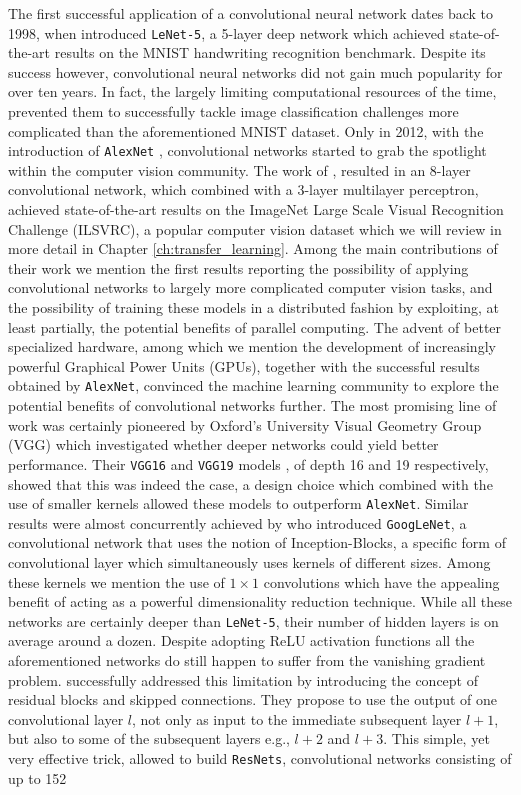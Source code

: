 The first successful application of a convolutional neural network dates back to 1998, when \citet{lecun1998gradient} introduced \texttt{LeNet-5}, a 5-layer deep network which achieved state-of-the-art results on the MNIST handwriting recognition benchmark. Despite its success however, convolutional neural networks did not gain much popularity for over ten years. In fact, the largely limiting computational resources of the time, prevented them to successfully tackle image classification challenges more complicated than the aforementioned MNIST dataset. Only in 2012, with the introduction of \texttt{AlexNet} \cite{krizhevsky2012imagenet}, convolutional networks started to grab the spotlight within the computer vision community.  The work of \citet{krizhevsky2012imagenet}, resulted in an 8-layer convolutional network, which combined with a 3-layer multilayer perceptron, achieved state-of-the-art results on the ImageNet Large Scale Visual Recognition Challenge (ILSVRC), a popular computer vision dataset which we will review in more detail in Chapter \ref{ch:transfer_learning}. Among the main contributions of their work we mention the first results reporting the possibility of applying convolutional networks to largely more complicated computer vision tasks, and the possibility of training these models in a distributed fashion by exploiting, at least partially, the potential benefits of parallel computing. The advent of better specialized hardware, among which we mention the development of increasingly powerful Graphical Power Units (GPUs), together with the successful results obtained by \texttt{AlexNet}, convinced the machine learning community to explore the potential benefits of convolutional networks further. The most promising line of work was certainly pioneered by Oxford's University Visual Geometry Group (VGG) which investigated whether deeper networks could yield better performance. Their \texttt{VGG16} and \texttt{VGG19} models \cite{simonyan2014very}, of depth 16 and 19 respectively, showed that this was indeed the case, a design choice which combined with the use of smaller kernels allowed these models to outperform \texttt{AlexNet}. Similar results were almost concurrently achieved by \citet{szegedy2015going} who introduced \texttt{GoogLeNet}, a convolutional network that uses the notion of Inception-Blocks, a specific form of convolutional layer which simultaneously uses kernels of different sizes. Among these kernels we mention the use of $1\times1$ convolutions which have the appealing benefit of acting as a powerful dimensionality reduction technique. While all these networks are certainly deeper than \texttt{LeNet-5}, their number of hidden layers is on average around a dozen. Despite adopting ReLU activation functions all the aforementioned networks do still happen to suffer from the vanishing gradient problem. \citet{he2016deep} successfully addressed this limitation by introducing the concept of residual blocks and skipped connections. They propose to use the output of one convolutional layer $l$, not only as input to the immediate subsequent layer $l+1$, but also to some of the subsequent layers e.g., $l+2$ and $l+3$. This simple, yet very effective trick, allowed \citet{he2016deep} to build \texttt{ResNets}, convolutional networks consisting of up to 152 